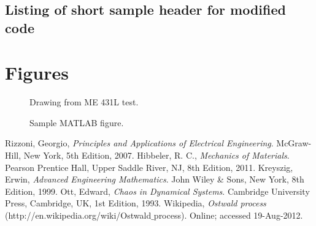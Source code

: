 \documentclass{article}
\begin{document}
\subsection{Listing of short sample header for modified code}

\pagebreak
\section{Figures \label{FigureList}}

\begin{figure}[htb]
\begin{center}
\caption{Drawing from ME 431L test.}
\end{center}
\end{figure}

\begin{figure}[htb]
\begin{center}
\caption{Sample MATLAB figure.}
\end{center}
\end{figure}
\pagebreak

\begin{thebibliography}{9}
Rizzoni, Georgio,
{\it Principles and Applications of Electrical Engineering}.
McGraw-Hill, New York,
5th Edition,
2007.
Hibbeler, R. C.,
{\it Mechanics of Materials}.
Pearson Prentice Hall, Upper Saddle River, NJ, 8th Edition, 2011.
Kreyszig, Erwin,
{\it Advanced Engineering Mathematics}.
John Wiley \& Sons, New York, 8th Edition, 1999.
Ott, Edward,
{\it Chaos in Dynamical Systems}.
Cambridge University Press, Cambridge, UK, 1st Edition, 1993.
Wikipedia, 
{\it Ostwald process} (http://en.wikipedia.org/wiki/Ostwald$\_$process).
Online; accessed 19-Aug-2012.
\end{thebibliography}
\end{document}
